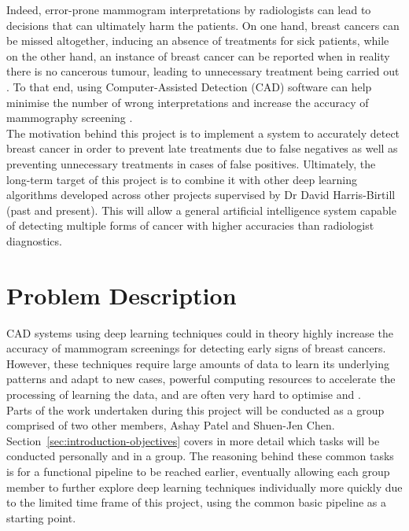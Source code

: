 Indeed, error-prone mammogram interpretations by radiologists can lead to decisions that can ultimately harm the patients. On one hand, breast cancers can be missed altogether, inducing an absence of treatments for sick patients, while on the other hand, an instance of breast cancer can be reported when in reality there is no cancerous tumour, leading to unnecessary treatment being carried out \citep{Elter2009}. To that end, using Computer-Assisted Detection (CAD) software can help minimise the number of wrong interpretations and increase the accuracy of mammography screening \citep{Shen2017}.\\

The motivation behind this project is to implement a system to accurately detect breast cancer in order to prevent late treatments due to false negatives as well as preventing unnecessary treatments in cases of false positives. Ultimately, the long-term target of this project is to combine it with other deep learning algorithms developed across other projects supervised by Dr David Harris-Birtill (past and present). This will allow a general artificial intelligence system capable of detecting multiple forms of cancer with higher accuracies than radiologist diagnostics.\\


\section{Problem Description}
\label{sec:problem-description}

CAD systems using deep learning techniques could in theory highly increase the accuracy of mammogram screenings for detecting early signs of breast cancers. However, these techniques require large amounts of data to learn its underlying patterns and adapt to new cases, powerful computing resources to accelerate the processing of learning the data, and are often very hard to optimise and .\\

Parts of the work undertaken during this project will be conducted as a group comprised of two other members, Ashay Patel and Shuen-Jen Chen. Section~\ref{sec:introduction-objectives} covers in more detail which tasks will be conducted personally and in a group. The reasoning behind these common tasks is for a functional pipeline to be reached earlier, eventually allowing each group member to further explore deep learning techniques individually more quickly due to the limited time frame of this project, using the common basic pipeline as a starting point.

